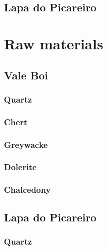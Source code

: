 \documentclass[12pt,twoside]{reedthesis}
\begin{document}
\hypertarget{lapa-do-picareiro-2}{%
\subsection{Lapa do Picareiro}\label{lapa-do-picareiro-2}}

\hypertarget{raw-materials}{%
\section{Raw materials}\label{raw-materials}}

\hypertarget{vale-boi-3}{%
\subsection{Vale Boi}\label{vale-boi-3}}

\hypertarget{quartz}{%
\subsubsection{Quartz}\label{quartz}}

\hypertarget{chert}{%
\subsubsection{Chert}\label{chert}}

\hypertarget{greywacke}{%
\subsubsection{Greywacke}\label{greywacke}}

\hypertarget{dolerite}{%
\subsubsection{Dolerite}\label{dolerite}}

\hypertarget{chalcedony}{%
\subsubsection{Chalcedony}\label{chalcedony}}

\hypertarget{lapa-do-picareiro-3}{%
\subsection{Lapa do Picareiro}\label{lapa-do-picareiro-3}}

\hypertarget{quartz-1}{%
\subsubsection{Quartz}\label{quartz-1}}
\end{document}
